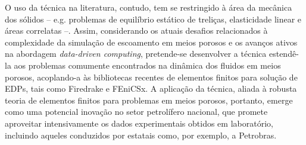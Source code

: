 
O uso da técnica na literatura, contudo, tem se restringido à área da mecânica dos sólidos -- e.g. problemas de equilíbrio estático de treliças, elasticidade linear e áreas correlatas --. Assim, considerando os atuais desafios relacionados à complexidade da simulação de escoamento em meios porosos e os avanços ativos na abordagem \textit{data-driven computing}, pretende-se desenvolver a técnica estendê-la aos problemas comumente encontrados na dinâmica dos fluidos em meios porosos, acoplando-a às bibliotecas recentes de elementos finitos para solução de EDPs, tais como Firedrake e FEniCSx. A aplicação da técnica, aliada à robusta teoria de elementos finitos para problemas em meios porosos, portanto, emerge como uma potencial inovação no setor petrolífero nacional, que promete aproveitar intensivamente os dados experimentais obtidos em laboratório, incluindo aqueles conduzidos por estatais como, por exemplo, a Petrobras. 




